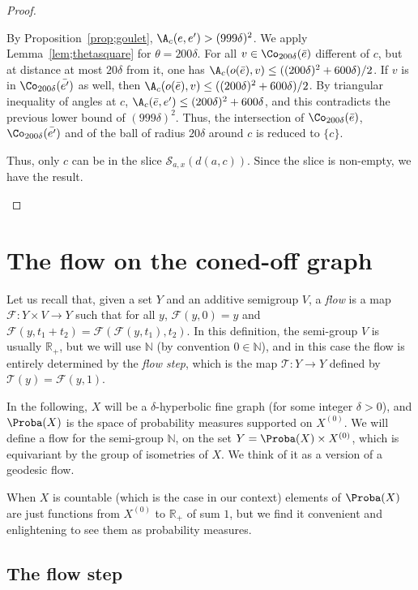 \begin{proof}
\begin{laststep}[\eqref{lem;un_goulet_de_slice}]
By Proposition~\ref{prop;goulet}, $\A_c(e, e') >(999\delta)^2$. We apply Lemma~\ref{lem;thetasquare} for $\theta=200\delta$. For all $v\in \Co_{200\delta}(\bar e)$ different of $c$, but at distance at most $20\delta$ from it, one has $\A_c(o(\bar e), v) \leq ((200\delta)^2 + 600\delta)/2$. If $v$ is in $\Co_{200\delta}(\bar{e'})$ as well, then $\A_c(o(\bar e), v) \leq ((200\delta)^2 + 600\delta)/2$. By triangular inequality of angles at $c$, $\A_c(\bar e, e')\leq (200\delta)^2 + 600\delta$, and this contradicts the previous lower bound of $(999\delta)^2$. Thus, the intersection of $\Co_{200\delta}(\bar e)$, $\Co_{200\delta}(\bar {e'})$ and of the ball of radius $20\delta$ around $c$ is reduced to $\{c\}$.

Thus, only $c$ can be in the slice $\mathcal{S}_{a,x} (d(a,c))$. Since the slice is non-empty, we have the result.
\end{laststep}
\let\qed\relax
\end{proof}

\section{The flow on the coned-off graph}

Let us recall that, given a set $Y$ and an additive semigroup $V$, a \emph{flow} is a map $\mathscr{F}: Y\times V \to Y$ such that for all $y$, $\mathscr{F}(y,0)=y$ and $\mathscr{F}(y, t_1+t_2) = \mathscr{F}(\mathscr{F}(y, t_1), t_2)$. In this definition, the semi-group $V$ is usually $\mathbb{R}_+$, but we will use $\mathbb{N}$ (by convention $0\in \mathbb{N}$), and in this case the flow is entirely determined by the \emph{flow step}, which is the map $\mathscr{T}: Y\to Y$ defined by $\mathscr{T} (y) = \mathscr{F}(y,1) $.

In the following, $X$ will be a $\delta$-hyperbolic fine graph (for some integer $\delta >0$), and $\Proba(X)$ is the space of probability measures supported on $X^{(0)}$. We will define a flow for the semi-group $\mathbb{N}$, on the set $Y= \Proba(X) \times X^{(0)}$, which is equivariant by the group of isometries of $X$. We think of it as a version of a geodesic flow.

When $X$ is countable (which is the case in our context) elements of $\Proba(X)$ are just functions from $X^{(0)}$ to $\mathbb{R}_+$ of sum $1$, but we find it convenient and enlightening to see them as probability measures.
\subsection{The flow step}\label{sec;def_flowstep}

